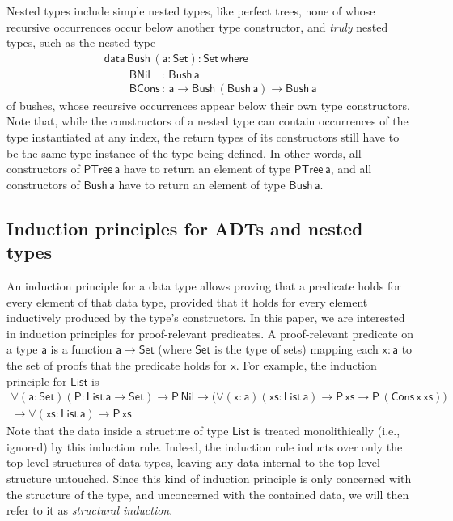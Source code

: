 \documentclass[acmsmall,screen,review,anonymous]{acmart}
\theoremstyle{definition}
\begin{document}
Nested types include simple nested types, like perfect trees,
none of whose recursive occurrences occur below another type constructor,
and \emph{truly} nested types, such as the nested type
\begin{equation}\label{eq:bush}
\begin{array}{l}
\mathsf{data\, Bush\,(a : Set) : Set\,where}\\
\mathsf{\;\;\;\;\;\;\;\;BNil\,\,\,\,\,\, :\, Bush\,a}\\
\mathsf{\;\;\;\;\;\;\;\;BCons\, :\, a \to Bush\,(Bush\,a) \to Bush\,a} 
\end{array}
\end{equation}
of bushes, whose recursive occurrences appear below their own type constructors.
Note that, while the constructors of a nested type can contain occurrences of the type instantiated at any index,
the return types of its constructors still have to be the same type instance of the type being defined.
In other words, all constructors of $\mathsf{PTree\,a}$ have to return an element of type $\mathsf{PTree\,a}$,
and all constructors of $\mathsf{Bush\,a}$ have to return an element of type $\mathsf{Bush\,a}$.


\subsection{Induction principles for ADTs and nested types}\label{ssec:induction-nested}

An induction principle for a data type allows proving
that a predicate holds for every element of that data type,
provided that it holds for every element inductively produced by the type's constructors.
In this paper, we are interested in induction principles for proof-relevant predicates.
A proof-relevant predicate on a type $\mathsf{a}$ is a function $\mathsf{a \to Set}$
(where $\mathsf{Set}$ is the type of sets)
mapping each $\mathsf{x : a}$ to the set of proofs that the predicate holds for $\mathsf{x}$.
For example, the induction principle for $\mathsf{List}$ is
\begin{multline*}
\mathsf{\forall (a : Set) (P : List\,a \to Set) \to P\,Nil \to \big( \forall (x : a) (xs: List\,a) \to P\,xs \to P\,(Cons\,x\,xs)\big)} \\
\mathsf{\to \forall (xs : List\,a) \to P\, xs }
\end{multline*}
Note that the data inside a structure of type $\mathsf{List}$ is treated monolithically (i.e., ignored) by this induction rule.
Indeed, the induction rule inducts over only the top-level structures of data types,
leaving any data internal to the top-level structure untouched.
Since this kind of induction principle is only concerned with the structure of the type,
and unconcerned with the contained data,
we will then refer to it as \emph{structural induction}.
\end{document}
